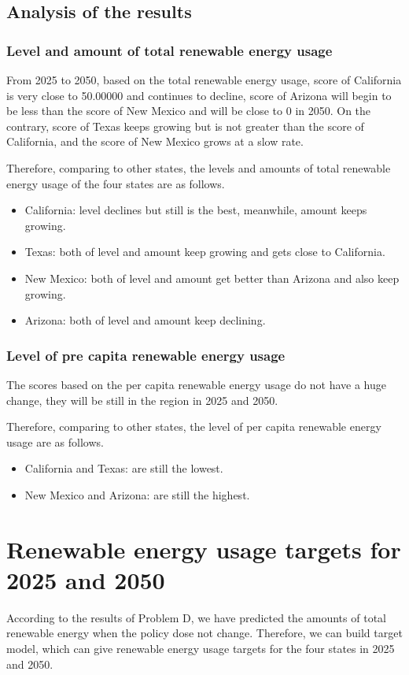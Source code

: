 \documentclass[a4paper,11pt]{article}
\begin{document}
\subsection{Analysis of the results}
\subsubsection{Level and amount of total renewable energy usage}
\par From 2025 to 2050, based on the total renewable energy usage, score of California is very close to 50.00000 and continues to decline, score of Arizona will begin to be less than the score of New Mexico and will be close to 0 in 2050. On the contrary, score of Texas keeps growing but is not greater than the score of California, and the score of New Mexico grows at a slow rate.
\par Therefore, comparing to other states, the levels and amounts of total renewable energy usage of the four states are as follows.
\begin{itemize}
    \item California: level declines but still is the best, meanwhile, amount keeps growing.
    \item Texas: both of level and amount keep growing and gets close to California.
    \item New Mexico: both of level and amount get better than Arizona and also keep growing.
    \item Arizona: both of level and amount keep declining.
\end{itemize}
\subsubsection{Level of pre capita renewable energy usage}
\par The scores based on the per capita renewable energy usage do not have a huge change, they will be still in the region in 2025 and 2050.
\par Therefore, comparing to other states, the level of per capita renewable energy usage are as follows.
\begin{itemize}
    \item California and Texas: are still the lowest.
    \item New Mexico and Arizona: are still the highest.
\end{itemize}



\section{Renewable energy usage targets for 2025 and 2050}
\par According to the results of Problem D, we have predicted the amounts of total renewable energy when the policy dose not change. Therefore, we can build target model, which can give renewable energy usage targets for the four states in 2025 and 2050.
\end{document}
